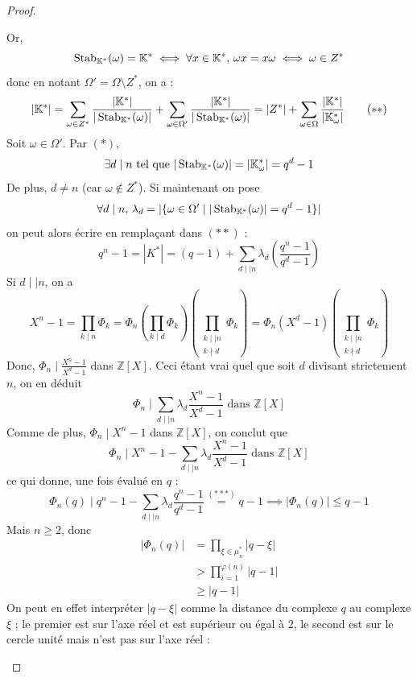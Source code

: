 \begin{proof}
\begin{itemize}
      Or,
      \[ \operatorname{Stab}_{\mathbb{K}^*}(\omega) = \mathbb{K}^* \iff \forall x \in \mathbb{K}^*, \, \omega x = x \omega \iff \omega \in Z^* \]
      donc en notant $\Omega' = \Omega \setminus Z^*$, on a :
      \[ |\mathbb{K}^*| = \sum_{\omega \in Z^*} \frac{|\mathbb{K}^*|}{|\operatorname{Stab}_{\mathbb{K}^*}(\omega)|} + \sum_{\omega \in \Omega'} \frac{|\mathbb{K}^*|}{|\operatorname{Stab}_{\mathbb{K}^*}(\omega)|} = |Z^*| + \sum_{\omega \in \Omega} \frac{|\mathbb{K}^*|}{|\mathbb{K}^*_\omega|} \tag{$**$} \]
      Soit $\omega \in \Omega'$. Par $(*)$,
      \[ \exists d \mid n \text{ tel que } |\operatorname{Stab}_{\mathbb{K}^*}(\omega)| = |\mathbb{K}^*_\omega| = q^d - 1 \]
      De plus, $d \neq n$ (car $\omega \notin Z^*$). Si maintenant on pose
      \[ \forall d \mid n, \, \lambda_d = |\{ \omega \in \Omega' \mid |\operatorname{Stab}_{\mathbb{K}^*}(\omega)| = q^d - 1 \}| \]
      on peut alors écrire en remplaçant dans $(**)$ :
      \[ q^n - 1 = |K^*| = (q - 1) + \sum_{d \mid \mid n} \lambda_d \left( \frac{q^n - 1}{q^d - 1} \right) \tag{$***$} \]
      Si $d \mid \mid n$, on a
      \[ X^n-1 = \prod_{k \mid n} \Phi_k = \Phi_n \left ( \prod_{k \mid d} \Phi_k \right ) \left ( \prod_{\substack{k \mid \mid n \\ k \nmid d}} \Phi_k \right ) = \Phi_n (X^d - 1) \left ( \prod_{\substack{k \mid \mid n \\ k \nmid d}} \Phi_k \right ) \]
      Donc, $\Phi_n \mid \frac{X^n - 1}{X^d - 1}$ dans $\mathbb{Z}[X]$. Ceci étant vrai quel que soit $d$ divisant strictement $n$, on en déduit
      \[ \Phi_n \mid \sum_{d \mid \mid n} \lambda_d \frac{X^n - 1}{X^d - 1} \text{ dans } \mathbb{Z}[X] \]
      Comme de plus, $\Phi_n \mid X^n - 1$ dans $\mathbb{Z}[X]$, on conclut que
      \[ \Phi_n \mid X^n - 1 - \sum_{d \mid \mid n} \lambda_d \frac{X^n - 1}{X^d - 1} \text{ dans } \mathbb{Z}[X] \]
      ce qui donne, une fois évalué en $q$ :
      \[ \Phi_n(q) \mid q^n - 1 - \sum_{d \mid \mid n} \lambda_d \frac{q^n - 1}{q^d - 1} \overset{(***)}{=} q-1 \implies |\Phi_n(q)| \leq q-1 \]
      Mais $n \geq 2$, donc
      \begin{align*}
        |\Phi_n(q)| &= \prod_{\xi \in \mu_n^*} |q - \xi| \\
        &> \prod_{i=1}^{\varphi(n)} |q - 1| \\
        &\geq |q-1|
      \end{align*}
      On peut en effet interpréter $|q - \xi|$ comme la distance du complexe $q$ au complexe $\xi$ ; le premier est sur l'axe réel et est supérieur ou égal à $2$, le second est sur le cercle unité mais n'est pas sur l'axe réel :
      \begin{center}

\end{center}
\end{itemize}
\end{proof}
